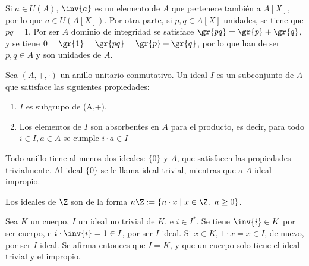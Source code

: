 \begin{prop}\label{unidades_de_A_y_A[X]}
\end{prop}

\begin{dem}{\cite[p.~119]{GamboaAnillos}}
Si $a\in U(A)$, $\inv{a}$ es un elemento de $A$ que pertenece también a $A[X]$, por lo que $a \in U(A[X])$. Por otra parte, si $p,q \in A[X]$ unidades, se tiene que $pq = 1$. Por ser $A$ dominio de integridad se satisface $\gr{pq} = \gr{p} + \gr{q}$, y se tiene $0 = \gr{1} = \gr{pq} = \gr{p} + \gr{q}$, por lo que han de ser $p,q \in A$ y son unidades de $A$.
\end{dem}




\begin{deff}[Ideal]{\cite[p.~25]{GamboaAnillos}}
    Sea $(A,+,\cdot)$ un anillo unitario conmutativo. Un ideal $I$ es un subconjunto de $A$ que satisface las siguientes propiedades:
    \begin{enumerate}[label=\roman*)]
        \item $I$ es subgrupo de (A,+).
        \item Los elementos de $I$ son absorbentes en $A$ para el producto, es decir, para todo $i \in I, a\in A$ se cumple $i\cdot a \in I$
    \end{enumerate}
\end{deff}

\begin{obs}
    Todo anillo tiene al menos dos ideales: $\{0\}$ y $A$, que satisfacen las propiedades trivialmente. Al ideal $\{0\}$ se le llama ideal trivial, mientras que a $A$ ideal impropio.
\end{obs}

\begin{ejs}
    \item Los ideales de $\Z$ son de la forma $n\Z:= \{ n \cdot x\mid x\in\Z, \ n\geq 0\}$.

    \item Sea $K$ un cuerpo, $I$ un ideal no trivial de $K$, e $i\in I^*$. Se tiene $\inv{i}\in K$ por ser cuerpo, e $i \cdot \inv{i}  = 1\in I$, por ser $I$ ideal. Si $x \in K$, $1\cdot x = x \in I$, de nuevo, por ser $I$ ideal. Se afirma entonces que  $I = K$, y que un cuerpo solo tiene el ideal trivial y el impropio.

    
\end{ejs}



